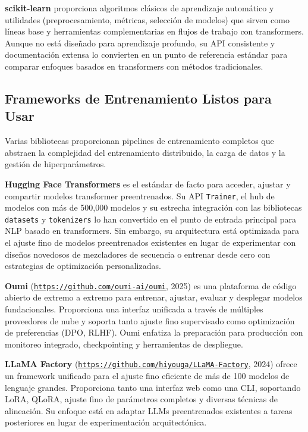 \textbf{scikit-learn} \citep{pedregosa_scikit-learn_2011} proporciona algoritmos clásicos de aprendizaje automático y utilidades (preprocesamiento, métricas, selección de modelos) que sirven como líneas base y herramientas complementarias en flujos de trabajo con transformers. Aunque no está diseñado para aprendizaje profundo, su API consistente y documentación extensa lo convierten en un punto de referencia estándar para comparar enfoques basados en transformers con métodos tradicionales.

\subsection{Frameworks de Entrenamiento Listos para Usar}

Varias bibliotecas proporcionan pipelines de entrenamiento completos que abstraen la complejidad del entrenamiento distribuido, la carga de datos y la gestión de hiperparámetros.

\textbf{Hugging Face Transformers} \citep{wolf_huggingface_2020} es el estándar de facto para acceder, ajustar y compartir modelos transformer preentrenados. Su API \texttt{Trainer}, el hub de modelos con más de 500,000 modelos y su estrecha integración con las bibliotecas \texttt{datasets} y \texttt{tokenizers} lo han convertido en el punto de entrada principal para NLP basado en transformers. Sin embargo, su arquitectura está optimizada para el ajuste fino de modelos preentrenados existentes en lugar de experimentar con diseños novedosos de mezcladores de secuencia o entrenar desde cero con estrategias de optimización personalizadas.

\textbf{Oumi} (\texttt{\url{https://github.com/oumi-ai/oumi}}, 2025) es una plataforma de código abierto de extremo a extremo para entrenar, ajustar, evaluar y desplegar modelos fundacionales. Proporciona una interfaz unificada a través de múltiples proveedores de nube y soporta tanto ajuste fino supervisado como optimización de preferencias (DPO, RLHF). Oumi enfatiza la preparación para producción con monitoreo integrado, checkpointing y herramientas de despliegue.

\textbf{LLaMA Factory} (\texttt{\url{https://github.com/hiyouga/LLaMA-Factory}}, 2024) ofrece un framework unificado para el ajuste fino eficiente de más de 100 modelos de lenguaje grandes. Proporciona tanto una interfaz web como una CLI, soportando LoRA, QLoRA, ajuste fino de parámetros completos y diversas técnicas de alineación. Su enfoque está en adaptar LLMs preentrenados existentes a tareas posteriores en lugar de experimentación arquitectónica.

